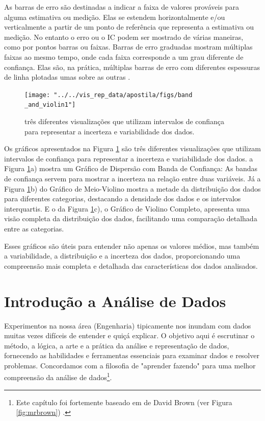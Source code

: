 \documentclass[article]{memoir}
\begin{document}
As barras de erro são destinadas a indicar a faixa de valores prováveis para alguma estimativa ou medição. Elas se estendem horizontalmente e/ou verticalmente a partir de um ponto de referência que representa a estimativa ou medição. No entanto o  erro ou o IC podem ser mostrado de várias maneiras, como por pontos barras ou faixas. Barras de erro graduadas mostram múltiplas faixas ao mesmo tempo, onde cada faixa corresponde a um grau diferente de confiança. Elas são, na prática, múltiplas barras de erro com diferentes espessuras de linha plotadas umas sobre as outras \cite{Wilke2019}.

\begin{figure}[ht]
	\centering
	\texttt{[image: "../../vis\_rep\_data/apostila/figs/band \_and\_violin1"]}
	\caption{três diferentes visualizações que utilizam intervalos de confiança para representar a incerteza e variabilidade dos dados.}
	\label{fig:band-andviolin1}
\end{figure}
Os gráficos apresentados na Figura \ref{fig:band-andviolin1}  são três diferentes visualizações que utilizam intervalos de confiança para representar a incerteza e variabilidade dos dados.
a Figura \ref{fig:band-andviolin1}a) mostra um Gráfico de Dispersão com Banda de Confiança: As bandas de confiança servem para mostrar a incerteza na relação entre duas variáveis. Já a Figura \ref{fig:band-andviolin1}b) do Gráfico de Meio-Violino mostra a metade da distribuição dos dados para diferentes categorias, destacando a densidade dos dados e os intervalos interquartis.
 E o da Figura \ref{fig:band-andviolin1}c), o Gráfico de Violino Completo, apresenta uma visão completa da distribuição dos dados, facilitando uma comparação detalhada entre as categorias.

Esses gráficos são úteis para entender não apenas os valores médios, mas também a variabilidade, a distribuição e a incerteza dos dados, proporcionando uma compreensão mais completa e detalhada das características dos dados analisados.
\chapter{Introdução a Análise de Dados}

Experimentos na nossa área (Engenharia) tipicamente nos inundam com dados muitas vezes difíceis de entender e quiçá explicar. O objetivo aqui é escrutinar o método, a lógica, a arte e a prática da análise e representação de dados, fornecendo as habilidades e ferramentas essenciais para examinar dados e resolver problemas. Concordamos com a filosofia de "aprender fazendo" para uma melhor compreensão da análise de dados\footnote{Este capítulo foi fortemente baseado em \cite{brown2021statistics} de David Brown (ver Figura \ref{fig:mrbrown})  .}.
\end{document}
